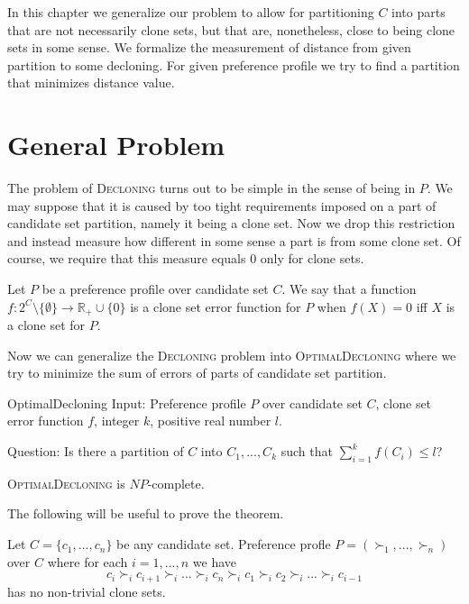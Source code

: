 In this chapter we generalize our problem to allow for partitioning $C$ into parts
that are not necessarily clone sets, but that are, nonetheless, close to being clone sets in some sense.
We formalize the measurement of distance from given partition to some decloning.
For given preference profile we try to find a partition that minimizes distance value.

\section{General Problem}

The problem of \textsc{Decloning} turns out to be simple in the sense of being in $P$.
We may suppose that it is caused by too tight requirements imposed on a part of candidate set partition,
namely it being a clone set.
Now we drop this restriction and instead measure how different in some sense a part is from some clone set.
Of course, we require that this measure equals $0$ only for clone sets.

\begin{defn}
Let $P$ be a preference profile over candidate set $C$.
We say that a function
$f: 2^C \setminus \{\emptyset\} \rightarrow \mathbb{R}_+\cup\{0\}$
is a clone set error function for $P$ when $f(X) = 0$ iff $X$ is a clone set for $P$.
\end{defn}

Now we can generalize the \textsc{Decloning} problem into \textsc{OptimalDecloning}
where we try to minimize the sum of errors of parts of candidate set partition.

\begin{problem}{OptimalDecloning}
	Input: Preference profile $P$ over candidate set $C$, clone set error function $f$,
		integer $k$, positive real number $l$.

	Question: Is there a partition of $C$ into $C_1, ..., C_k$ such that $\sum_{i=1}^k f(C_i) \leq l$?
\end{problem}

\begin{thm} \label{optdecl}
	\textsc{OptimalDecloning} is $NP$-complete.
\end{thm}

The following will be useful to prove the theorem.

\begin{lmm} \label{lmmnotrivial}
        Let $C = \{c_1, ..., c_n\}$ be any candidate set.
	Preference profle $P = (\succ_1, ... , \succ_n)$ over $C$
	where for each $i=1,...,n$ we have
	$$c_i \succ_i c_{i+1} \succ_i ... \succ_i c_n \succ_i c_1 \succ_i c_2 \succ_i ... \succ_i c_{i-1}$$
	has no non-trivial clone sets.
\end{lmm}

